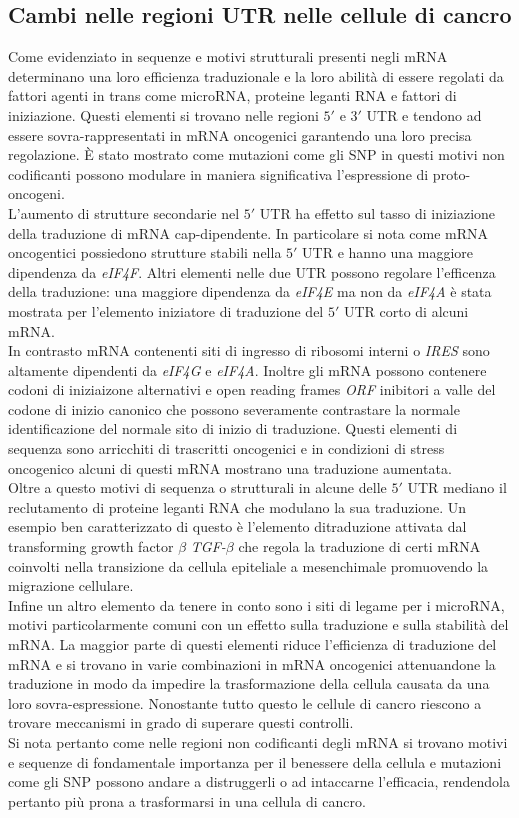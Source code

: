 	\subsection{Cambi nelle regioni UTR nelle cellule di cancro}
	Come evidenziato in \cite{tranconcancer} sequenze e motivi strutturali presenti negli mRNA determinano una loro efficienza traduzionale e la loro abilit\`a di essere regolati da fattori agenti in trans come microRNA, proteine leganti RNA e fattori di iniziazione.
	Questi elementi si trovano nelle regioni $5'$ e $3'$ UTR e tendono ad essere sovra-rappresentati in mRNA oncogenici garantendo una loro precisa regolazione.
	\`E stato mostrato come mutazioni come gli SNP in questi motivi non codificanti possono modulare in maniera significativa l'espressione di proto-oncogeni.\\
	L'aumento di strutture secondarie nel $5'$ UTR ha effetto sul tasso di iniziazione della traduzione di mRNA cap-dipendente.
	In particolare si nota come mRNA oncogentici possiedono strutture stabili nella $5'$ UTR e hanno una maggiore dipendenza da \emph{eIF4F}.
	Altri elementi nelle due UTR possono regolare l'efficenza della traduzione: una maggiore dipendenza da \emph{eIF4E} ma non da \emph{eIF4A} \`e stata mostrata per l'elemento iniziatore di traduzione del $5'$ UTR corto di alcuni mRNA.\\
	In contrasto mRNA contenenti siti di ingresso di ribosomi interni o \emph{IRES} sono altamente dipendenti da \emph{eIF4G} e \emph{eIF4A}.
	Inoltre gli mRNA possono contenere codoni di iniziaizone alternativi e open reading frames \emph{ORF} inibitori a valle del codone di inizio canonico che possono severamente contrastare la normale identificazione del normale sito di inizio di traduzione.
	Questi elementi di sequenza sono arricchiti di trascritti oncogenici e in condizioni di stress oncogenico alcuni di questi mRNA mostrano una traduzione aumentata.\\
	Oltre a questo motivi di sequenza o strutturali in alcune delle $5'$ UTR mediano il reclutamento di proteine leganti RNA che modulano la sua traduzione.
	Un esempio ben caratterizzato di questo \`e l'elemento ditraduzione attivata dal transforming growth factor $\beta$ \emph{TGF-$\beta$} che regola la traduzione di certi mRNA coinvolti nella transizione da cellula epiteliale a mesenchimale promuovendo la migrazione cellulare.\\
	Infine un altro elemento da tenere in conto sono i siti di legame per i microRNA, motivi particolarmente comuni con un effetto sulla traduzione e sulla stabilit\`a del mRNA.
	La maggior parte di questi elementi riduce l'efficienza di traduzione del mRNA e si trovano in varie combinazioni in mRNA oncogenici attenuandone la traduzione in modo da impedire la trasformazione della cellula causata da una loro sovra-espressione.
	Nonostante tutto questo le cellule di cancro riescono a trovare meccanismi in grado di superare questi controlli.\\
	Si nota pertanto come nelle regioni non codificanti degli mRNA si trovano motivi e sequenze di fondamentale importanza per il benessere della cellula e mutazioni come gli SNP possono andare a distruggerli o ad intaccarne l'efficacia, rendendola pertanto pi\`u prona a trasformarsi in una cellula di cancro.

